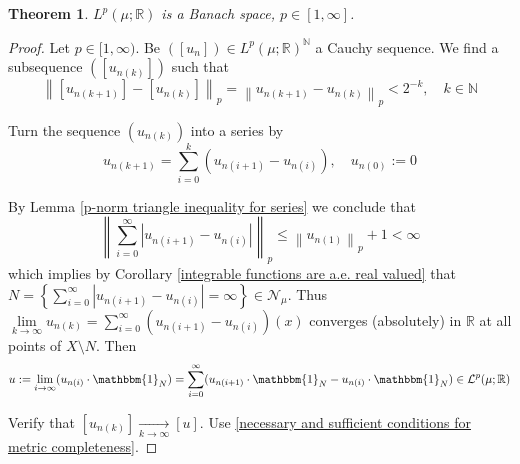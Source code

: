 \documentclass[11pt, a4paper, openany]{book}
\newtheorem{thm}{Theorem}\newtheorem{lem}{Lemma}\newtheorem{crl}{Corollary}
\theoremstyle{definition}
\begin{document}
    \begin{thm}
        $L^p(\mu;\mathbb{R})$ is a Banach space, $p\in [1,\infty]$.
    \end{thm}
    \begin{proof}
        Let $p\in[1,\infty)$. Be $([u_n])\in L^p(\mu;\mathbb{R})^\mathbb{N}$ a Cauchy sequence. We find a subsequence $([u_{n(k)}])$ such that
        \[\left\|[u_{n(k+1)}]-[u_{n(k)}]\right\|_p=\left\|u_{n(k+1)}-u_{n(k)}\right\|_p<2^{-k},\quad k\in\mathbb{N}\]
        \par Turn the sequence $(u_{n(k)})$ into a series by
        \[u_{n(k+1)}=\sum_{i=0}^k(u_{n(i+1)}-u_{n(i)}),\quad u_{n(0)}:=0\]
        \par By Lemma \ref{p-norm triangle inequality for series} we conclude that
        \[
            \left\|\sum_{i=0}^\infty|u_{n(i+1)}-u_{n(i)}|\right\|_p\leqslant \left\|u_{n(1)}\right\|_p+1<\infty
        \]
        which implies by Corollary \ref{integrable functions are a.e. real valued} that $N=\left\{\sum\limits_{i=0}^\infty|u_{n(i+1)}-u_{n(i)}|=\infty\right\}\in\mathscr{N}_\mu$.
        Thus $\lim\limits_{k\to\infty}u_{n(k)}=\sum\limits_{i=0}^\infty (u_{n(i+1)}-u_{n(i)})(x)$ converges (absolutely) in $\mathbb{R}$ at all points of $X\setminus N$. Then
        \[
            u:=\lim_{i\to\infty} (u_{n(i)}\cdot\mathbbm{1}_{N})=\sum_{i=0}^\infty (u_{n(i+1)}\cdot\mathbbm{1}_{N}-u_{n(i)}\cdot\mathbbm{1}_{N})\in\mathcal{L}^p(\mu;\mathbb{R})
        \]
        \par Verify that $[u_{n(k)}]\underset{k\to\infty}\to[u]$. Use \autoref{necessary and sufficient conditions for metric completeness}.
    \end{proof}
\end{document}
